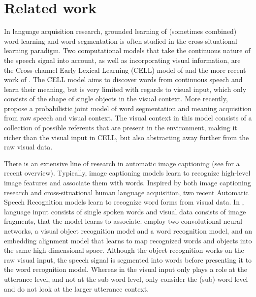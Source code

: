 \section{Related work}

In language acquisition research, grounded learning of (sometimes combined) word learning and word segmentation is often studied in the cross-situational learning paradigm. %
Two computational models that take the continuous nature of the speech signal into account, as well as incorporating visual information, are the Cross-channel Early Lexical Learning (CELL) model of  and the more recent work of . The CELL model aims to discover words from continuous speech and learn their meaning, but is very limited with regards to visual input, which only consists of the shape of single objects in the visual context. More recently,  propose a probabilistic joint model of word segmentation and meaning acquisition from raw speech and visual context. The visual context in this model consists of a collection of possible referents that are present in the environment, making it richer than the visual input in CELL, but also abstracting away further from the raw visual data. 

There is an extensive line of research in automatic image captioning (see  for a recent overview). Typically, image captioning models learn to recognize high-level image features and associate them with words. Inspired by both image captioning research and cross-situational human language acquisition, two recent Automatic Speech Recognition models learn to recognize word forms from visual data. In , language input consists of single spoken words and visual data consists of image fragments, that the model learns to associate.  employ two convolutional neural networks, a visual object recognition model and a word recognition model, and an embedding alignment model that learns to map recognized words and objects into the same high-dimensional space. Although the object recognition works on the raw visual input, the speech signal is segmented into words before presenting it to the word recognition model. Whereas in  the visual input only plays a role at the utterance level, and not at the sub-word level,  only consider the (sub)-word level and do not look at the larger utterance context. 

